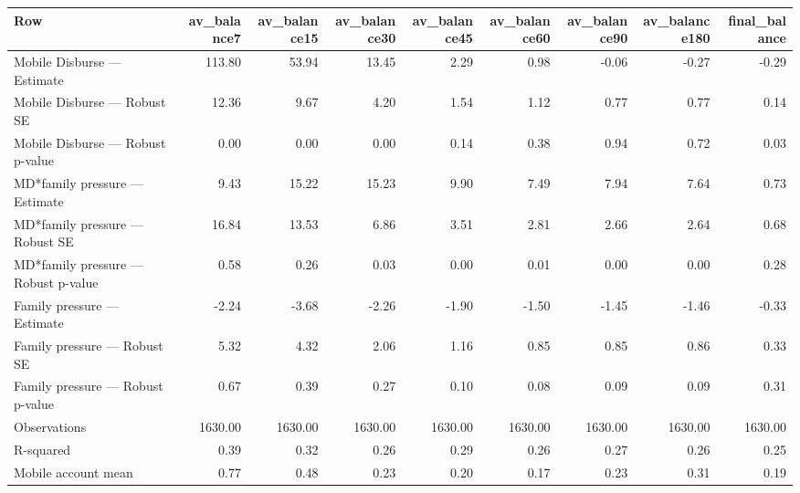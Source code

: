 
\begin{tabular}{lrrrrrrrr}
\toprule
Row & av\_balance7 & av\_balance15 & av\_balance30 & av\_balance45 & av\_balance60 & av\_balance90 & av\_balance180 & final\_balance\\
\midrule
Mobile Disburse — Estimate & 113.80 & 53.94 & 13.45 & 2.29 & 0.98 & -0.06 & -0.27 & -0.29\\
Mobile Disburse — Robust SE & 12.36 & 9.67 & 4.20 & 1.54 & 1.12 & 0.77 & 0.77 & 0.14\\
Mobile Disburse — Robust p-value & 0.00 & 0.00 & 0.00 & 0.14 & 0.38 & 0.94 & 0.72 & 0.03\\
MD*family pressure — Estimate & 9.43 & 15.22 & 15.23 & 9.90 & 7.49 & 7.94 & 7.64 & 0.73\\
MD*family pressure — Robust SE & 16.84 & 13.53 & 6.86 & 3.51 & 2.81 & 2.66 & 2.64 & 0.68\\
\addlinespace
MD*family pressure — Robust p-value & 0.58 & 0.26 & 0.03 & 0.00 & 0.01 & 0.00 & 0.00 & 0.28\\
Family pressure — Estimate & -2.24 & -3.68 & -2.26 & -1.90 & -1.50 & -1.45 & -1.46 & -0.33\\
Family pressure — Robust SE & 5.32 & 4.32 & 2.06 & 1.16 & 0.85 & 0.85 & 0.86 & 0.33\\
Family pressure — Robust p-value & 0.67 & 0.39 & 0.27 & 0.10 & 0.08 & 0.09 & 0.09 & 0.31\\
Observations & 1630.00 & 1630.00 & 1630.00 & 1630.00 & 1630.00 & 1630.00 & 1630.00 & 1630.00\\
\addlinespace
R-squared & 0.39 & 0.32 & 0.26 & 0.29 & 0.26 & 0.27 & 0.26 & 0.25\\
Mobile account mean & 0.77 & 0.48 & 0.23 & 0.20 & 0.17 & 0.23 & 0.31 & 0.19\\
\bottomrule
\end{tabular}
